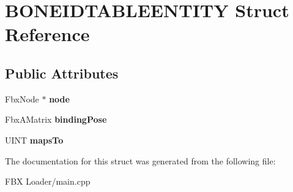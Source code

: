 \hypertarget{struct_b_o_n_e_i_d_t_a_b_l_e_e_n_t_i_t_y}{}\section{B\+O\+N\+E\+I\+D\+T\+A\+B\+L\+E\+E\+N\+T\+I\+TY Struct Reference}
\label{struct_b_o_n_e_i_d_t_a_b_l_e_e_n_t_i_t_y}
\subsection*{Public Attributes}
\begin{DoxyCompactItemize}
\item 
Fbx\+Node $\ast$ {\bfseries node}\hypertarget{struct_b_o_n_e_i_d_t_a_b_l_e_e_n_t_i_t_y_af8b54066754906fa3cd8867059640684}{}\label{struct_b_o_n_e_i_d_t_a_b_l_e_e_n_t_i_t_y_af8b54066754906fa3cd8867059640684}

\item 
Fbx\+A\+Matrix {\bfseries binding\+Pose}\hypertarget{struct_b_o_n_e_i_d_t_a_b_l_e_e_n_t_i_t_y_aa4c5f19c61d80cfa23fc0f44b049c055}{}\label{struct_b_o_n_e_i_d_t_a_b_l_e_e_n_t_i_t_y_aa4c5f19c61d80cfa23fc0f44b049c055}

\item 
U\+I\+NT {\bfseries maps\+To}\hypertarget{struct_b_o_n_e_i_d_t_a_b_l_e_e_n_t_i_t_y_a12c1d4630228de51b792e78095a61fc9}{}\label{struct_b_o_n_e_i_d_t_a_b_l_e_e_n_t_i_t_y_a12c1d4630228de51b792e78095a61fc9}

\end{DoxyCompactItemize}


The documentation for this struct was generated from the following file\+:\begin{DoxyCompactItemize}
\item 
F\+B\+X Loader/main.\+cpp\end{DoxyCompactItemize}
